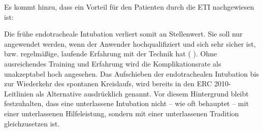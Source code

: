 {Es kommt hinzu, dass ein Vorteil für den Patienten
durch die ETI  nachgewiesen ist:


Die frühe endotracheale Intubation verliert somit an
Stellenwert.
Sie soll nur angewendet werden, wenn der Anwender hochqualifiziert
und sich sehr sicher ist,
bzw. regelmäßige, laufende Erfahrung
mit der Technik hat 
( \cite{Erc2010Sec4,Erc-2015-Section-03}).
Ohne ausreichendes Training und Erfahrung wird die
Komplikationsrate als unakzeptabel hoch angesehen. Das
Aufschieben der endotrachealen Intubation bis zur Wiederkehr
des spontanen Kreislaufs, wird bereits in den ERC 2010-Leitlinien
als Alternative ausdrücklich genannt.
\cite{Nolan2001,
Nolan2008,
Lecky2008,
Erc2010Sec4}
Vor diesem Hintergrund bleibt festzuhalten, dass eine
unterlassene Intubation nicht -- wie oft behauptet -- mit
einer unterlassenen Hilfeleistung, sondern mit einer
unterlassenen Tradition gleichzusetzen ist.


}
